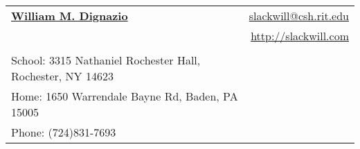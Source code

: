 \documentclass[letterpaper,11pt]{article}
\begin{document}
 

\thispagestyle{empty}
\pagestyle{empty}

\newcommand{\mywebheader}{
\begin{tabular*}{7in}{l@{\extracolsep{\fill}}r} \\
	\textbf{\href{http://www.slackwill.com/}{\large William M. Dignazio}} & \href{mailto:slackwill@csh.rit.edu}{slackwill@csh.rit.edu}\\ &
	\href{http://slackwill.com/}{http://slackwill.com} \\ \vspace{-10mm} \\
	{\footnotesize {{School: 3315 Nathaniel Rochester Hall,
Rochester, NY 14623}}} & \\
	{\footnotesize {{Home: 1650 Warrendale Bayne Rd, Baden, PA 15005}}} & \\
	{\footnotesize {{Phone: (724)831-7693}}} & 

	\end{tabular*}
\\
\vspace{0.1in}}

\mywebheader
\end{document}
